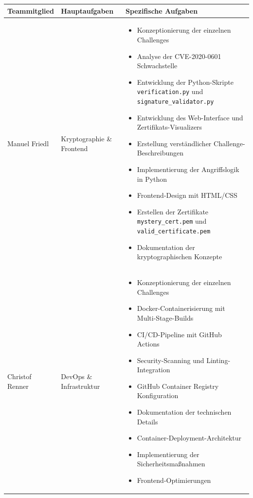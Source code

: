 \documentclass{article}
\begin{document}
\begin{longtable}{|p{3cm}|p{5cm}|p{6cm}|}
    \hline
    \textbf{Teammitglied} & \textbf{Hauptaufgaben} & \textbf{Spezifische Aufgaben} \\
    \hline
    \endhead

    Manuel Friedl & Kryptographie \& Frontend & 
    \begin{itemize}
        \item Konzeptionierung der einzelnen Challenges
        \item Analyse der CVE-2020-0601 Schwachstelle
        \item Entwicklung der Python-Skripte \texttt{verification.py} und \texttt{signature\_validator.py} 
        \item Entwicklung des Web-Interface und Zertifikats-Visualizers
        \item Erstellung verständlicher Challenge-Beschreibungen
        \item Implementierung der Angriffslogik in Python
        \item Frontend-Design mit HTML/CSS
        \item Erstellen der Zertifikate \texttt{mystery\_cert.pem} und \texttt{valid\_certificate.pem}
        \item Dokumentation der kryptographischen Konzepte
    \end{itemize} \\
    \hline

    Christof Renner & DevOps \& Infrastruktur & 
    \begin{itemize}
        \item Konzeptionierung der einzelnen Challenges
        \item Docker-Containerisierung mit Multi-Stage-Builds
        \item CI/CD-Pipeline mit GitHub Actions
        \item Security-Scanning und Linting-Integration
        \item GitHub Container Registry Konfiguration
        \item Dokumentation der technischen Details
        \item Container-Deployment-Architektur
        \item Implementierung der Sicherheitsmaßnahmen
        \item Frontend-Optimierungen
    \end{itemize} \\
    \hline
    \end{longtable}
\end{document}
